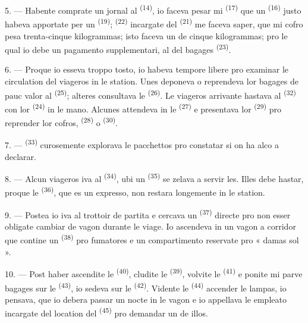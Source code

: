 5. --- Habente comprate un jornal al 
\textsuperscript{(14)}, io faceva pesar mi 
\textsuperscript{(17)} que un  \textsuperscript{(16)} justo
habeva apportate per un  \textsuperscript{(19)};
 \textsuperscript{(22)} incargate del  \textsuperscript{(21)} me faceva saper, que mi cofro pesa trenta-cinque
kilogrammas; isto faceva un  de cinque kilogrammas; pro
le qual io debe un pagamento supplementari, al  del bagages
\textsuperscript{(23)}.

6. --- Proque io esseva troppo tosto, io habeva tempore libere pro examinar le
circulation del viageros in le station. Unes deponeva o reprendeva lor bagages
de pauc valor al  \textsuperscript{(25)}; alteres
consultava le  \textsuperscript{(26)}. Le viageros arrivante
hastava al  \textsuperscript{(32)} con lor 
\textsuperscript{(24)} in le mano. Alcunes attendeva in le  \textsuperscript{(27)} e presentava lor 
\textsuperscript{(29)} pro reprender lor cofros, 
\textsuperscript{(28)} o  \textsuperscript{(30)}.

7. ---  \textsuperscript{(33)} curosemente
explorava le pacchettos pro constatar si on ha alco a declarar.

8. --- Alcun viageros iva al  \textsuperscript{(34)}, ubi un
 \textsuperscript{(35)} se zelava a servir les. Illes debe hastar,
proque le  \textsuperscript{(36)}, que es un expresso, non
restara longemente in le station.

9. --- Postea io iva al trottoir de partita e cercava un 
\textsuperscript{(37)} directe pro non esser obligate cambiar de vagon durante le
viage. Io ascendeva in un vagon a corridor que contine un 
\textsuperscript{(38)} pro fumatores e un compartimento reservate pro
« damas sol ».

\VUsaut{3.0mm}

10. --- Post haber ascendite le  \textsuperscript{(40)}, cludite
le  \textsuperscript{(39)}, volvite le 
\textsuperscript{(41)} e ponite mi parve bagages sur le 
\textsuperscript{(43)}, io sedeva sur le 
\textsuperscript{(42)}. Vidente le  \textsuperscript{(44)}
accender le lampas, io pensava, que io debera passar un nocte in le vagon e io
appellava le empleato incargate del location del 
\textsuperscript{(45)} pro demandar un de illos.

